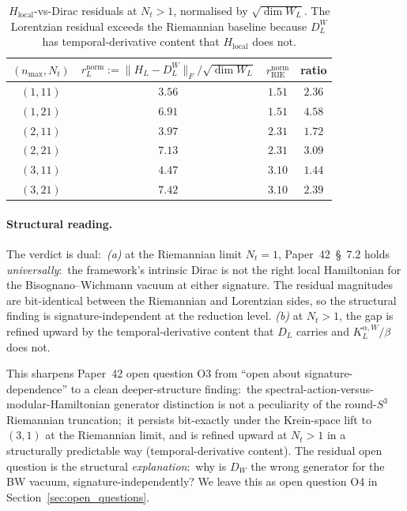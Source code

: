 \documentclass[11pt,a4paper]{article}
\theoremstyle{plain}
\theoremstyle{definition}
\newcommand{\nmax}{n_{\max}}
\newcommand{\Nt}{N_t}
\newcommand{\sthree}{S^{3}}
\newcommand{\Frob}[1]{\lVert #1 \rVert_{F}}
\newcommand{\DL}{D_{L}}
\newcommand{\KL}{K_{L}}
\begin{document}
\begin{table}[ht]
\centering
\caption{$H_{\mathrm{local}}$-vs-Dirac residuals at $\Nt > 1$,
normalised by $\sqrt{\dim W_L}$. The Lorentzian residual exceeds the
Riemannian baseline because $\DL^W$ has temporal-derivative content
that $H_{\mathrm{local}}$ does not.}
\label{tab:H_local_residuals_Nt_gt_1}
\begin{tabular}{cccc}
\toprule
$(\nmax, \Nt)$ &
$r_L^{\mathrm{norm}} := \Frob{H_L - \DL^W}/\sqrt{\dim W_L}$ &
$r_{\mathrm{RIE}}^{\mathrm{norm}}$ & ratio\\
\midrule
$(1, 11)$ & $3.56$ & $1.51$ & $2.36$ \\
$(1, 21)$ & $6.91$ & $1.51$ & $4.58$ \\
$(2, 11)$ & $3.97$ & $2.31$ & $1.72$ \\
$(2, 21)$ & $7.13$ & $2.31$ & $3.09$ \\
$(3, 11)$ & $4.47$ & $3.10$ & $1.44$ \\
$(3, 21)$ & $7.42$ & $3.10$ & $2.39$ \\
\bottomrule
\end{tabular}
\end{table}

\paragraph{Structural reading.}
The verdict is dual:\
\emph{(a)} at the Riemannian limit $\Nt = 1$, Paper~42~\S~7.2 holds
\emph{universally}:\ the framework's intrinsic Dirac is not the right
local Hamiltonian for the Bisognano--Wichmann vacuum at either signature.
The residual magnitudes are bit-identical between the Riemannian and
Lorentzian sides, so the structural finding is
signature-independent at the reduction level.
\emph{(b)} at $\Nt > 1$, the gap is refined upward by the
temporal-derivative content that $\DL$ carries and $\KL^{\alpha, W}/\beta$
does not.

This sharpens Paper~42 open question O3 from
``open about signature-dependence'' to a clean deeper-structure
finding:\ the spectral-action-versus-modular-Hamiltonian generator
distinction is not a peculiarity of the round-$\sthree$ Riemannian
truncation;\ it persists bit-exactly under the Krein-space lift to
$(3, 1)$ at the Riemannian limit, and is refined upward at $\Nt > 1$
in a structurally predictable way (temporal-derivative content). The
residual open question is the structural \emph{explanation}:\ why is
$D_W$ the wrong generator for the BW vacuum, signature-independently?
We leave this as open question O4 in Section~\ref{sec:open_questions}.
\end{document}
